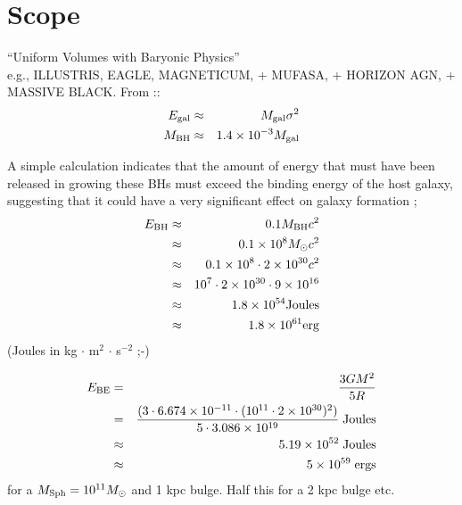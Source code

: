\documentclass[11pt,a4paper]{article}
\begin{document}
\section{Scope}
``Uniform Volumes with Baryonic Physics'' \\
e.g., ILLUSTRIS, EAGLE,  MAGNETICUM, + MUFASA, + HORIZON AGN, + MASSIVE BLACK.
From \citet{Fabian2012}:: 
\begin{eqnarray}
    E_{\rm gal} & \approx & M_{\rm gal} \sigma^2 \\
  M_{\rm BH} & \approx & 1.4 \times 10^{-3} M_{\rm gal}\\
\end{eqnarray}

\citep[From][]{Somerville_Dave2015} A simple calculation indicates
that the amount of energy that must have been released in growing
these BHs must exceed the binding energy of the host galaxy,
suggesting that it could have a very significant effect on galaxy
formation \citet{Silk_Rees1998};
\begin{eqnarray}
   E_{\rm BH}  & \approx & 0.1 M_{\rm BH} c^{2} \\ 
                  &  \approx & 0.1\times 10^{8} M_{\odot} c^{2} \\
                  &  \approx & 0.1\times 10^{8} \cdot 2\times10^{30} c^{2} \\
                  &  \approx & 10^{7} \cdot 2\times10^{30} \cdot 9\times10^{16} \\
                  &  \approx & 1.8\times10^{54} {\rm Joules}\\
                  &  \approx & 1.8\times10^{61} {\rm erg}\\
\end{eqnarray}
(Joules in kg $\cdot$ m$^{2}$ $\cdot$ s$^{-2}$ ;-) 

\begin{eqnarray}
   E_{\rm BE}  & = &  \frac {3GM^{2}} {5R} \\
                 & =  &  \frac{(3 \cdot 6.674\times10^{-11} \cdot (10^{11} \cdot 2\times10^{30})^{2})} 
                              {5 \cdot 3.086\times10^{19}} \;  {\rm Joules} \\ 
               & \approx  & 5.19 \times 10^{52} \; {\rm Joules}\\ 
               & \approx  &5 \times 10^{59} \; {\rm ergs} \\ 
\end{eqnarray}
for a $M_{\rm Sph} = 10^{11} M_{\odot}$ and 1 kpc bulge. 
Half this for a 2 kpc bulge etc. 
\end{document}

